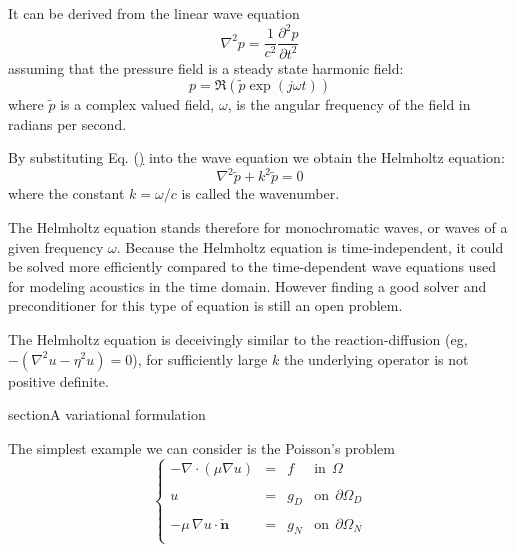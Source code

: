 It can be derived from the linear wave equation
\begin{equation}
       \nabla^2 p = \frac{1}{c^2}\frac{\partial^2 p}{\partial t^2}
\end{equation}
assuming that the pressure field is a steady state harmonic field:
\begin{equation}
       p = \Re\left(\tilde{p} \exp\left(j\omega t\right) \right)
       \label{eq:time-harmonic}
\end{equation}
where $\tilde{p}$ is a complex valued field, $\omega$, is the angular  frequency of the field in radians per second. 

By substituting Eq. (\href{eq:time-harmonic}) into the wave equation we obtain the Helmholtz equation:
\begin{equation}
 \nabla^2 \tilde{p} + k^2 \tilde{p}  = 0    
\end{equation}
where the constant $k= \omega/c$ is called the wavenumber. 

The Helmholtz equation stands therefore for monochromatic waves, or waves of a given frequency $\omega$.
Because the Helmholtz equation is time-independent, it could be solved more efficiently compared to the time-dependent
wave equations used for modeling acoustics in the time domain. However finding a good solver and preconditioner for this
type of equation is still an open problem.

The Helmholtz equation is deceivingly similar to the reaction-diffusion (eg, $-(\nabla^2 {u} - \eta^2 {u}) = 0$), for sufficiently 
large $k$ the underlying operator is not positive definite.

section{A variational formulation}

The simplest example we can consider is the Poisson's problem
\begin{equation}
\left \{
\begin{array}{rcll}
-\nabla \cdot \left ( \mu \nabla{u} \right) & = & f & \mbox{in}~~\Omega \\
& & & \\
u & = & g_D & \mbox{on}~~\partial{\Omega}_D \\
& & & \\
-\mu\,\nabla{u}\cdot \check{\mathbf{n}} & = & g_N & \mbox{on}~~\partial{\Omega}_N \\
\end{array}
\right.
\end{equation}


